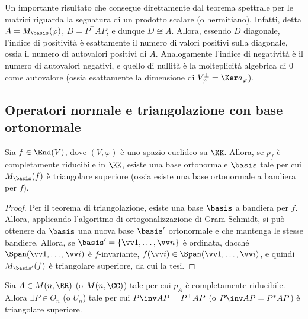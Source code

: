\begin{remark}\nl
	\li Un importante risultato che consegue direttamente dal teorema spettrale per le matrici riguarda
	la segnatura di un prodotto scalare (o hermitiano). Infatti, detta $A = M_\basis(\varphi)$,
	$D = P^\top A P$, e dunque $D \cong A$. Allora, essendo $D$ diagonale, l'indice di positività
	è esattamente il numero di valori positivi sulla diagonale, ossia il numero di autovalori
	positivi di $A$. Analogamente l'indice di negatività è il numero di autovalori negativi,
	e quello di nullità è la molteplicità algebrica di $0$ come autovalore (ossia esattamente
	la dimensione di $V^\perp_\varphi = \Ker a_\varphi$).
\end{remark}

\subsection{Operatori normale e triangolazione con base ortonormale}

\begin{theorem} 
	Sia $f \in \End(V)$, dove $(V, \varphi)$ è uno spazio euclideo su $\KK$. Allora,
	se $p_f$ è completamente riducibile in $\KK$, esiste una base ortonormale $\basis$
	tale per cui $M_\basis(f)$ è triangolare superiore (ossia esiste una base ortonormale
	a bandiera per $f$).
\end{theorem}

\begin{proof}
	Per il teorema di triangolazione, esiste una base $\basis$ a bandiera per $f$. Allora,
	applicando l'algoritmo di ortogonalizzazione di Gram-Schmidt, si può ottenere da $\basis$
	una nuova base $\basis'$ ortonormale e che mantenga le stesse bandiere. Allora,
	se $\basis' = \{ \vv1, \ldots, \vv n \}$ è ordinata, dacché $\Span(\vv 1, \ldots, \vv i)$ è $f$-invariante,
	$f(\vv i) \in \Span(\vv 1, \ldots, \vv i)$, e quindi $M_{\basis'}(f)$ è triangolare superiore, da cui la tesi.
\end{proof}

\begin{corollary}
	Sia $A \in M(n, \RR)$ (o $M(n, \CC)$) tale per cui $p_A$ è completamente riducibile.
	Allora $\exists P \in O_n$ (o $U_n$) tale per cui
	$P\inv A P = P^\top A P$ (o $P\inv A P = P^* A P$) è triangolare superiore.
\end{corollary}

